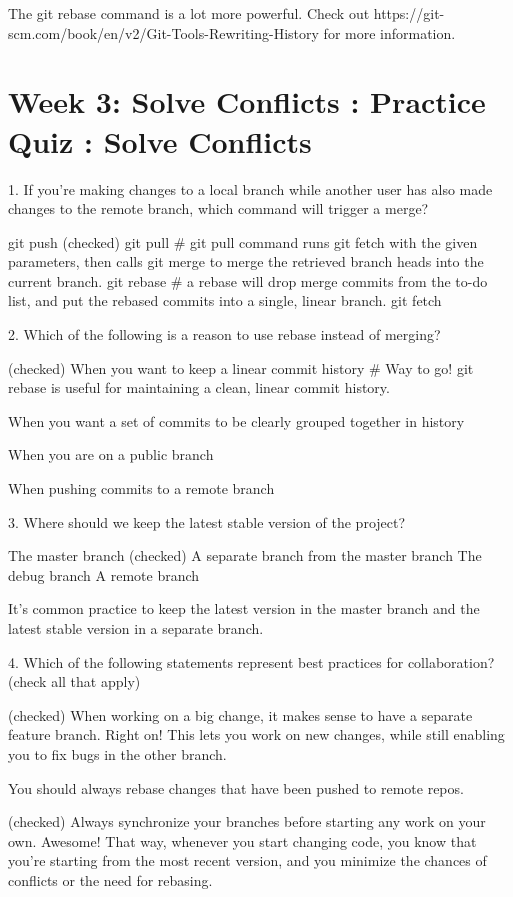 \documentclass[11pt, onecolumn]{article}
\begin{document}
The git rebase command is a lot more powerful.  Check out https://git-scm.com/book/en/v2/Git-Tools-Rewriting-History for more information.


\section{Week 3: Solve Conflicts : Practice Quiz : Solve Conflicts}

1. If you’re making changes to a local branch while another user has also made changes to the remote branch, which command will trigger a merge?

git push
(checked) git pull  #  git pull command runs git fetch with the given parameters, then calls git merge to merge the retrieved branch heads into the current branch.
git rebase    # a rebase will drop merge commits from the to-do list, and put the rebased commits into a single, linear branch.
git fetch


2. Which of the following is a reason to use rebase instead of merging? 

(checked) When you want to keep a linear commit history   # Way to go! git rebase is useful for maintaining a clean, linear commit history.

When you want a set of commits to be clearly grouped together in history

When you are on a public branch

When pushing commits to a remote branch


3. Where should we keep the latest stable version of the project?

The master branch
(checked) A separate branch from the master branch
The debug branch
A remote branch

It's common practice to keep the latest version in the master branch and the latest stable version in a separate branch.


4. Which of the following statements represent best practices for collaboration? (check all that apply)

(checked) When working on a big change, it makes sense to have a separate feature branch.
Right on! This lets you work on new changes, while still enabling you to fix bugs in the other branch.

You should always rebase changes that have been pushed to remote repos.

(checked) Always synchronize your branches before starting any work on your own.
Awesome! That way, whenever you start changing code, you know that you're starting from the most recent version, and you minimize the chances of conflicts or the need for rebasing.
\end{document}
